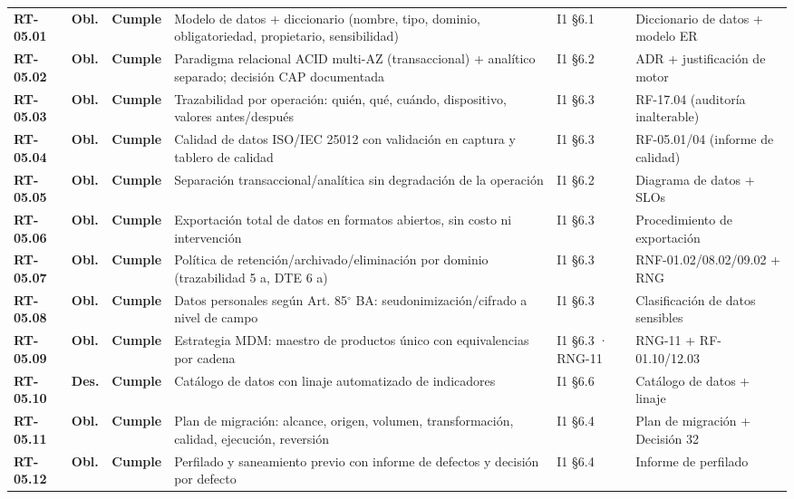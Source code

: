 \begin{small}
\begin{longtable}{@{}p{1.35cm} p{1.15cm} p{1.15cm} p{4.6cm} p{2.35cm} p{3.8cm}@{}}
\textbf{RT-05.01} & \textbf{Obl.} & \textbf{Cumple} & Modelo de datos + diccionario (nombre, tipo, dominio, obligatoriedad, propietario, sensibilidad) & I1 §6.1 & Diccionario de datos + modelo ER \\
\textbf{RT-05.02} & \textbf{Obl.} & \textbf{Cumple} & Paradigma relacional ACID multi-AZ (transaccional) + anal\'itico separado; decisi\'on CAP documentada & I1 §6.2 & ADR + justificaci\'on de motor \\
\textbf{RT-05.03} & \textbf{Obl.} & \textbf{Cumple} & Trazabilidad por operaci\'on: qui\'en, qu\'e, cu\'ando, dispositivo, valores antes/despu\'es & I1 §6.3 & RF-17.04 (auditor\'ia inalterable) \\
\textbf{RT-05.04} & \textbf{Obl.} & \textbf{Cumple} & Calidad de datos ISO/IEC 25012 con validaci\'on en captura y tablero de calidad & I1 §6.3 & RF-05.01/04 (informe de calidad) \\
\textbf{RT-05.05} & \textbf{Obl.} & \textbf{Cumple} & Separaci\'on transaccional/anal\'itica sin degradaci\'on de la operaci\'on & I1 §6.2 & Diagrama de datos + SLOs \\
\textbf{RT-05.06} & \textbf{Obl.} & \textbf{Cumple} & Exportaci\'on total de datos en formatos abiertos, sin costo ni intervenci\'on & I1 §6.3 & Procedimiento de exportaci\'on \\
\textbf{RT-05.07} & \textbf{Obl.} & \textbf{Cumple} & Pol\'itica de retenci\'on/archivado/eliminaci\'on por dominio (trazabilidad 5 a, DTE 6 a) & I1 §6.3 & RNF-01.02/08.02/09.02 + RNG \\
\textbf{RT-05.08} & \textbf{Obl.} & \textbf{Cumple} & Datos personales seg\'un Art. 85$^{\circ}$ BA: seudonimizaci\'on/cifrado a nivel de campo & I1 §6.3 & Clasificaci\'on de datos sensibles \\
\textbf{RT-05.09} & \textbf{Obl.} & \textbf{Cumple} & Estrategia MDM: maestro de productos \'unico con equivalencias por cadena & I1 §6.3 · RNG-11 & RNG-11 + RF-01.10/12.03 \\
\textbf{RT-05.10} & \textbf{Des.} & \textbf{Cumple} & Cat\'alogo de datos con linaje automatizado de indicadores & I1 §6.6 & Cat\'alogo de datos + linaje \\
\textbf{RT-05.11} & \textbf{Obl.} & \textbf{Cumple} & Plan de migraci\'on: alcance, origen, volumen, transformaci\'on, calidad, ejecuci\'on, reversi\'on & I1 §6.4 & Plan de migraci\'on + Decisi\'on 32 \\
\textbf{RT-05.12} & \textbf{Obl.} & \textbf{Cumple} & Perfilado y saneamiento previo con informe de defectos y decisi\'on por defecto & I1 §6.4 & Informe de perfilado \\

\end{longtable}
\end{small}
